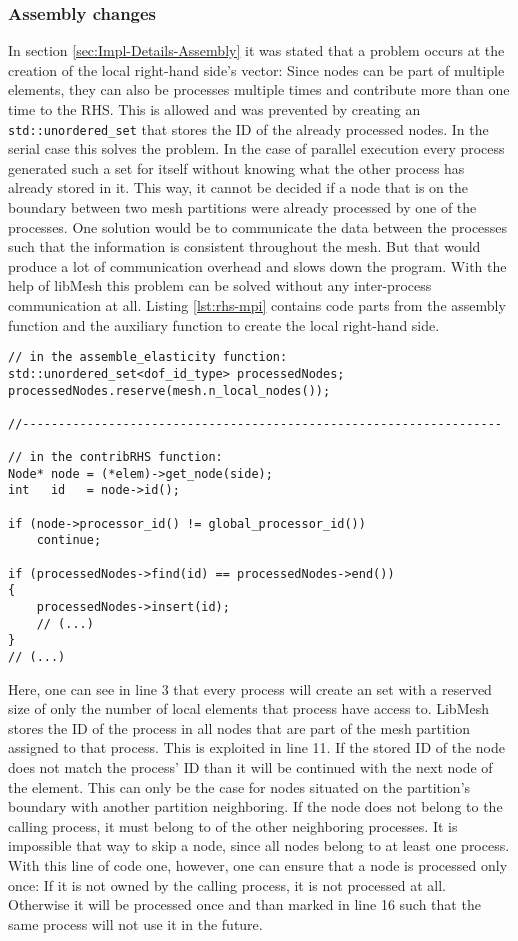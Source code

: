   
  
  \subsubsection{Assembly changes}\label{sec:Impl-Parallel-Assembly}
   In section \ref{sec:Impl-Details-Assembly} it was stated that a problem occurs at the creation of the local right-hand side's vector: Since nodes can be part of multiple elements, they can also be processes multiple times and contribute more than one time to the RHS. This is allowed and was prevented by creating an \texttt{std::unordered\_set} that stores the ID of the already processed nodes. In the serial case this solves the problem. In the case of parallel execution every process generated such a set for itself without knowing what the other process has already stored in it. This way, it cannot be decided if a node that is on the boundary between two mesh partitions were already processed by one of the processes. One solution would be to communicate the data between the processes such that the information is consistent throughout the mesh. But that would produce a lot of communication overhead and slows down the program. With the help of libMesh this problem can be solved without any inter-process communication at all. Listing \ref{lst:rhs-mpi} contains code parts from the assembly function and the auxiliary function to create the local right-hand side.
\begin{lstlisting}[caption=Process local nodes only,label=lst:rhs-mpi,keepspaces=true]
// in the assemble_elasticity function:
std::unordered_set<dof_id_type> processedNodes;
processedNodes.reserve(mesh.n_local_nodes());

//-------------------------------------------------------------------

// in the contribRHS function:
Node* node = (*elem)->get_node(side);
int   id   = node->id();

if (node->processor_id() != global_processor_id())
	continue;
	
if (processedNodes->find(id) == processedNodes->end())
{
	processedNodes->insert(id);
	// (...)
}
// (...)
\end{lstlisting}
   Here, one can see in line 3 that every process will create an set with a reserved size of only the number of local elements that process have access to. LibMesh stores the ID of the process in all nodes that are part of the mesh partition assigned to that process. This is exploited in line 11. If the stored ID of the node does not match the process' ID than it will be continued with the next node of the element. This can only be the case for nodes situated on the partition's boundary with another partition neighboring. If the node does not belong to the calling process, it must belong to of the other neighboring processes. It is impossible that way to skip a node, since all nodes belong to at least one process. With this line of code one, however, one can ensure that a node is processed only once: If it is not owned by the calling process, it is not processed at all. Otherwise it will be processed once and than marked in line 16 such that the same process will not use it in the future.